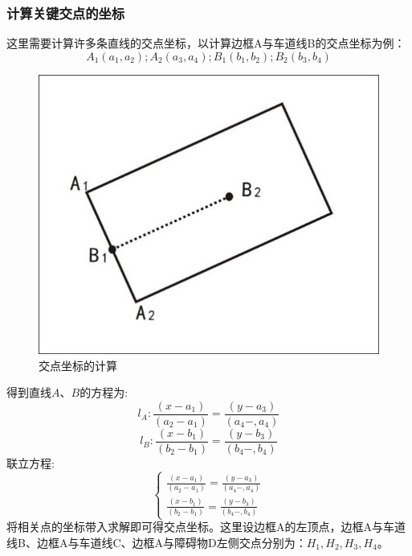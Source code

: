 \documentclass{article}
\begin{document}
\subsubsection{计算关键交点的坐标}
这里需要计算许多条直线的交点坐标，以计算边框A与车道线B的交点坐标为例：
\begin{equation*}
    A_{1}\left(a_{1}, a_{2}\right) ; A_{2}\left(a_{3}, a_{4}\right) ; B_{1}\left(b_{1}, b_{2}\right) ; B_{2}\left(b_{3}, b_{4}\right)
\end{equation*}
\begin{figure}[H]
    \centering
    \includegraphics[scale=0.9]{6.jpg}
    \caption{交点坐标的计算}
\end{figure}
\noindent 得到直线$A$、$B$的方程为:
\begin{equation}
    l_{A}: \frac{\left(x-a_{1}\right)}{\left(a_{2}-a_{1}\right)}=\frac{\left(y-a_{3}\right)}{\left(a_{4}-, a_{4}\right)}
\end{equation}
\begin{equation}
    l_{B}: \frac{\left(x-b_{1}\right)}{\left(b_{2}-b_{1}\right)}=\frac{\left(y-b_{3}\right)}{\left(b_{4}-, b_{4}\right)}
\end{equation}
联立方程:
\begin{equation*}
    \left\{\begin{aligned}
        \frac{\left(x-a_{1}\right)}{\left(a_{2}-a_{1}\right)}=\frac{\left(y-a_{3}\right)}{\left(a_{4}-, a_{4}\right)} \\
        \frac{\left(x-b_{1}\right)}{\left(b_{2}-b_{1}\right)}=\frac{\left(y-b_{3}\right)}{\left(b_{4}-, b_{4}\right)}
    \end{aligned}\right.
\end{equation*}
将相关点的坐标带入求解即可得交点坐标。这里设边框A的左顶点，边框A与车道线B、边框A与车道线C、边框A与障碍物D左侧交点分别为：$H_1,H_2,H_3,H_4$。
\end{document}
